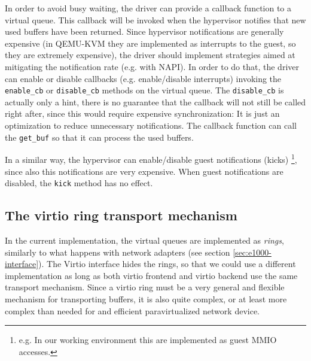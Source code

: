In order to avoid busy waiting, the driver can provide a callback function to a virtual queue. This callback will be invoked when the
hypervisor notifies that new used buffers have been returned. Since hypervisor notifications are generally expensive (in QEMU-KVM they are 
implemented as interrupts to the guest, so they are extremely expensive), the driver should implement strategies aimed at mitigating the
notification rate (e.g. with NAPI). In order to do that, the driver can enable or disable callbacks (e.g. enable/disable interrupts) 
invoking the \texttt{enable\_cb} or \texttt{disable\_cb} methods on the virtual queue. The \texttt{disable\_cb} is actually only a hint,
there is no guarantee that the callback will not still be called right after, since this would require expensive synchronization: It is
just an optimization to reduce unnecessary notifications.
The callback function can call the \texttt{get\_buf} so that it can process the used buffers.

\vspace{0.5cm}

In a similar way, the hypervisor can enable/disable guest notifications (kicks) \footnote{e.g. In our working environment this are
implemented as guest MMIO accesses.}, since also this notifications are very expensive. When guest notifications are disabled,
the \texttt{kick} method has no effect.


\subsection{The virtio ring transport mechanism}
In the current implementation, the virtual queues are implemented as \emph{rings}, similarly to what happens with network adapters (see
section \ref{sec:e1000-interface}). The Virtio interface hides the rings, so that we could use a different implementation as
long as both virtio frontend and virtio backend use the same transport mechanism.
Since a virtio ring must be a very general and flexible mechanism for transporting buffers, it is also quite complex, or at least more
complex than needed for and efficient paravirtualized network device.

\vspace{0.5cm}

